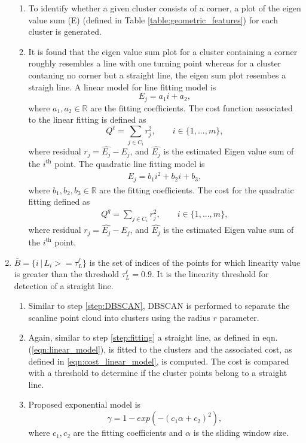 \begin{enumerate}
\begin{enumerate}
			\item To identify whether a given cluster consists of a corner, a plot of the eigen value sum (E) (defined in Table \ref{table:geometric_features}) for each cluster is generated.
			\item \label{step:fitting} It is found that the eigen value sum plot for a cluster containing a corner roughly resembles a line with one turning point whereas for a cluster contaning no corner but a straight line, the eigen sum plot resembes a straigh line. 
			A linear model for line fitting model is
			\begin{equation} \label{eqn:linear_model}
				E_j = a_1 i + a_2,
			\end{equation} 
			where $a_1,a_2 \in \mathbb{R}$ are the fitting coefficients. 
			The cost function associated to the linear fitting is defined as
			\begin{equation} \label{eqn:cost_linear_model}
				Q^\ell = \sum_{j \in C_i}{} r_j^2, \qquad i \in \{1, ..., m\},
			\end{equation}
			where residual $r_j = \hat{E_j} - E_j$, and $\hat{E_j}$ is the estimated Eigen value sum of the $i^\text{th}$ point.
			The quadratic line fitting model is
			\begin{align} \label{eqn:quadratic_model}
				E_j = b_1 i^2 + b_2 i + b_3,
			\end{align}
			where $b_1,b_2,b_3 \in \mathbb{R}$ are the fitting coefficients. 
			The cost for the quadratic fitting defined as
			\begin{align}
				Q^q = \sum_{j \in C_i}{} r_j^2, \qquad i \in \{1, ..., m\},
			\end{align}
			where residual $r_j = \hat{E_j} - E_j$, and $\hat{E_j}$ is the estimated Eigen value sum of the $i^\text{th}$ point.			
		\end{enumerate}
	
	
	\item $\bar{B} = \{i \, | \, L_i >= \tau_L^\ell \}$ is the set of indices of the points for which linearity value is greater than the threshold $\tau_L^\ell = 0.9$. It is the linearity threshold for detection of a straight line.
	
	\begin{enumerate}
		\item Similar to step \ref{step:DBSCAN}, DBSCAN is performed to separate the scanline point cloud into clusters using the radius $r$ parameter.
		\item Again, similar to step \ref{step:fitting} a straight line, as defined in eqn. (\ref{eqn:linear_model}), is fitted to the clusters and the associated cost, as defined in \ref{eqn:cost_linear_model}, is computed. The cost is compared with a threshold to determine if the cluster points belong to a straight line.
		\item Proposed exponential model is 
		\begin{equation}
			\gamma = 1 - exp(-(c_1 \alpha + c_2)^2),
		\end{equation}
	where $c_1,c_2$ are the fitting coefficients and $\alpha$ is the sliding window size.
	\end{enumerate}
	

\end{enumerate}
